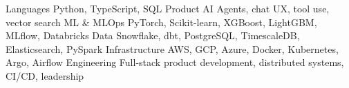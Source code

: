 \begin{cvskills}
  \cvskill
    {Languages}
    {Python, TypeScript, SQL}
  \cvskill
    {Product AI}
    {Agents, chat UX, tool use, vector search}
  \cvskill
    {ML \& MLOps}
    {PyTorch, Scikit-learn, XGBoost, LightGBM, MLflow, Databricks}
  \cvskill
    {Data}
    {Snowflake, dbt, PostgreSQL, TimescaleDB, Elasticsearch, PySpark}
  \cvskill
    {Infrastructure}
    {AWS, GCP, Azure, Docker, Kubernetes, Argo, Airflow}
  \cvskill
    {Engineering}
    {Full-stack product development, distributed systems, CI/CD, leadership}
\end{cvskills}
